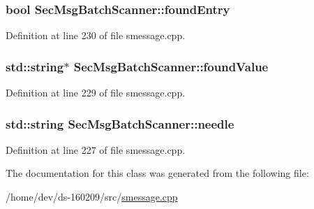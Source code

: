 \hypertarget{class_sec_msg_batch_scanner_a1842d0e149b314a7beb82cc4840f5565}{}
\subsubsection[{found\+Entry}]{\setlength{\rightskip}{0pt plus 5cm}bool Sec\+Msg\+Batch\+Scanner\+::found\+Entry}\label{class_sec_msg_batch_scanner_a1842d0e149b314a7beb82cc4840f5565}


Definition at line 230 of file smessage.\+cpp.

\hypertarget{class_sec_msg_batch_scanner_a1f9a62489af577112cbe0db50e155e58}{}
\subsubsection[{found\+Value}]{\setlength{\rightskip}{0pt plus 5cm}std\+::string$\ast$ Sec\+Msg\+Batch\+Scanner\+::found\+Value}\label{class_sec_msg_batch_scanner_a1f9a62489af577112cbe0db50e155e58}


Definition at line 229 of file smessage.\+cpp.

\hypertarget{class_sec_msg_batch_scanner_a15f820824b8c5f64a3fba97b9133a50e}{}
\subsubsection[{needle}]{\setlength{\rightskip}{0pt plus 5cm}std\+::string Sec\+Msg\+Batch\+Scanner\+::needle}\label{class_sec_msg_batch_scanner_a15f820824b8c5f64a3fba97b9133a50e}


Definition at line 227 of file smessage.\+cpp.



The documentation for this class was generated from the following file\+:\begin{DoxyCompactItemize}
\item 
/home/dev/ds-\/160209/src/\hyperlink{smessage_8cpp}{smessage.\+cpp}\end{DoxyCompactItemize}
